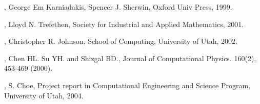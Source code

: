 

\begin{thebibliography}{9}

,
        George Em Karniadakis, Spencer J. Sherwin, \/
        Oxford Univ Press, 1999.

,
        Lloyd N. Trefethen, \/
        Society for Industrial and Applied Mathematics, 2001.

,
        Christopher R. Johnson, \/
        School of Computing, University of Utah, 2002.

,
        Chen HL. Su YH. and Shizgal BD., \/
        Journal of Computational Physics. 160(2), 453-469 (2000).

,
        S. Choe, \/
        Project report in Computational Engineering and Science Program, University of Utah, 2004.


\end{thebibliography}
